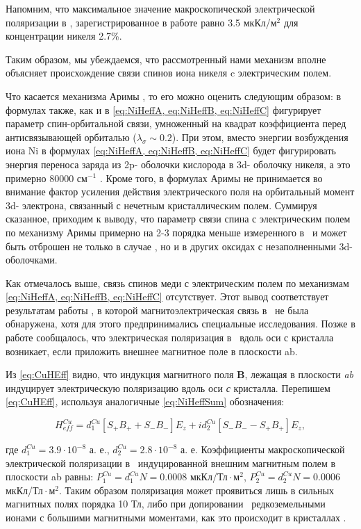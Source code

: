 Напомним, что максимальное значение макроскопической электрической поляризации в \ncbo, зарегистрированное в работе \cite{Khanh2013} равно 3.5 мкКл/м$^{2}$ для концентрации никеля 2.7\%.

Таким образом, мы убеждаемся, что рассмотренный нами механизм вполне объясняет происхождение связи спинов иона никеля c электрическим полем. 

Что касается механизма Аримы \cite{Arima2007}, то его можно оценить следующим образом: в формулах \cite{Arima2007} также, как и в \cref{eq:NiHeffA, eq:NiHeffB, eq:NiHeffC} фигурирует параметр спин-орбитальной связи, умноженный на квадрат коэффициента перед антисвязывающей орбиталью ($\lambda_{\sigma}\sim0.2$). При этом, вместо энергии возбуждения иона Ni в формулах \cref{eq:NiHeffA, eq:NiHeffB, eq:NiHeffC} будет фигурировать энергия переноса заряда из 2p- оболочки кислорода в 3d- оболочку никеля, а это примерно 80000 см$^{-1}$ \cite{Simonetti1977}. Кроме того, в формулах Аримы \cite{Arima2007} не принимается во внимание фактор усиления действия электрического поля на орбитальный момент 3d- электрона, связанный с нечетным кристаллическим полем. Суммируя сказанное, приходим к выводу, что параметр связи спина с электрическим полем по механизму Аримы примерно на 2-3 порядка меньше измеренного в \ncbo\ и может быть отброшен не только в случае \ncbo, но и в других оксидах с незаполненными 3d-оболочками.

Как отмечалось выше, связь спинов меди с электрическим полем по механизмам \cref{eq:NiHeffA, eq:NiHeffB, eq:NiHeffC} отсутствует. Этот вывод соответствует результатам работы \cite{Nenert2007}, в которой магнитоэлектрическая связь в \cbo\ не была обнаружена, хотя для этого предпринимались специальные исследования. Позже в работе \cite{Toyoda2016} сообщалось, что электрическая поляризация в \cbo\ вдоль оси с кристалла возникает, если приложить внешнее магнитное поле в плоскости ab. 

Из \cref{eq:CuHEff} видно, что индукция магнитного поля \textbf{B}, лежащая в плоскости \textit{ab} индуцирует электрическую поляризацию вдоль оси \textit{с} кристалла. Перепишем \cref{eq:CuHEff}, используя аналогичные \cref{eq:NiHeffSum} обозначения:

\begin{equation}
	\label{eq:CuHeffSum}
	H_{eff}^{Cu}=d_{1}^{Cu} \left[S_{+} B_{+}+S_{-} B_{-}\right] E_{z} + i d_{2}^{Cu}\left[S_{-} B_{-}-S_{+} B_{+}\right] E_{z},
\end{equation}

где $d_{1}^{Cu}=3.9\cdot10^{-8}$ а. е., $d_{2}^{Cu}=2.8\cdot10^{-8}$ а. е.
Коэффициенты макроскопической электрической поляризации в \cbo\, индуцированной внешним магнитным полем в плоскости ab равны: $P_{1}^{Cu}\mathop{=}d_{1}^{Cu}N\mathop{=}0.0008$ мкКл/Тл$\mathop{\cdot}$м$^{2}$, $P_{2}^{Cu}\mathop{=}d_{2}^{Cu}N\mathop{=}0.0006$ мкКл/Тл$\mathop{\cdot}$м$^{2}$.
Таким образом поляризация может проявиться лишь в сильных магнитных полях порядка 10 Тл, либо при допировании \cbo\  редкоземельными ионами с большими магнитными моментами, как это происходит в  кристаллах  \cite{Eremin2020}.

\FloatBarrier

